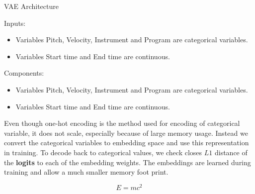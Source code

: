 \documentclass[final]{beamer}
\newlength{\onecolwid}
\newlength{\twocolwid}
\begin{document}
\begin{frame}[t]
\begin{columns}[t]
\begin{column}{\twocolwid}
\begin{columns}[t,totalwidth=\twocolwid]
\end{columns} %



\begin{columns}[t,totalwidth=\twocolwid] %

\begin{column}{\onecolwid} %



\begin{block}{VAE Architecture}

Inputs:

\begin{itemize}
\item Variables Pitch, Velocity, Instrument and Program are categorical variables.
\item Variables Start time and End time are continuous.
\end{itemize}

Components:
\begin{itemize}
\item Variables Pitch, Velocity, Instrument and Program are categorical variables.
\item Variables Start time and End time are continuous.
\end{itemize}

Even though one-hot encoding is the method used for encoding of categorical variable, it does not scale, especially because of large memory usage. Instead we convert the categorical variables to embedding space and use this representation in training. To decode back to categorical values, we check closes $L1$ distance of the \textbf{logits} to each of the embedding weights. The embeddings are learned during training and allow a much smaller memory foot print.
 
\begin{equation}
E = mc^{2}
\label{eqn:Einstein}
\end{equation}


\end{block}
\end{column}
\end{columns}
\end{column}
\end{columns}
\end{frame}
\end{document}
